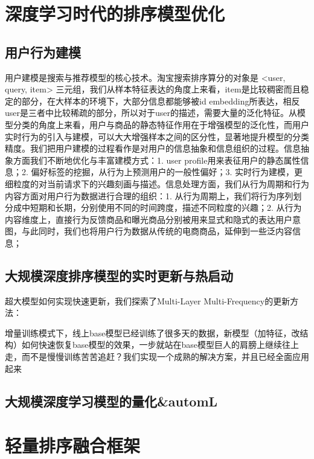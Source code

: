 \section{深度学习时代的排序模型优化 }

\subsection{用户行为建模} 
用户建模是搜索与推荐模型的核心技术。淘宝搜索排序算分的对象是 <user, query, item> 三元组，我们从样本特征表达的角度上来看，item是比较稠密而且稳定的部分，在大样本的环境下，大部分信息都能够被id embedding所表达，相反user是三者中比较稀疏的部分，所以对于user的描述，需要大量的泛化特征。从模型分类的角度上来看，用户与商品的静态特征作用在于增强模型的泛化性，而用户实时行为的引入与建模，可以大大增强样本之间的区分性，显著地提升模型的分类精度。我们把用户建模的过程看作是对用户的信息抽象和信息组织的过程。信息抽象方面我们不断地优化与丰富建模方式：1. user profile用来表征用户的静态属性信息；2. 偏好标签的挖掘，从行为上预测用户的一般性偏好；3. 实时行为建模，更细粒度的对当前请求下的兴趣刻画与描述。信息处理方面，我们从行为周期和行为内容方面对用户行为数据进行合理的组织：1. 从行为周期上，我们将行为序列划分成中短期和长期，分别使用不同的时间跨度，描述不同粒度的兴趣；2. 从行为内容维度上，直接行为反馈商品和曝光商品分别被用来显式和隐式的表达用户意图，与此同时，我们也将用户行为数据从传统的电商商品，延伸到一些泛内容信息； 



\subsection{大规模深度排序模型的实时更新与热启动} 

超大模型如何实现快速更新，我们探索了Multi-Layer Multi-Frequency的更新方法：


增量训练模式下，线上base模型已经训练了很多天的数据，新模型（加特征，改结构）如何快速恢复base模型的效果，一步就站在base模型巨人的肩膀上继续往上走，而不是慢慢训练苦苦追赶？我们实现一个成熟的解决方案，并且已经全面应用起来

\subsection{大规模深度学习模型的量化\&automL} 


\section{ 轻量排序融合框架 } 

